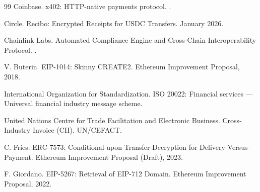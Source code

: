 \documentclass[11pt,a4paper]{article}
\begin{document}
\begin{thebibliography}{99}
Coinbase.
\newblock x402: HTTP-native payments protocol.
.

Circle.
\newblock Recibo: Encrypted Receipts for USDC Transfers.
\newblock January 2026.

Chainlink Labs.
\newblock Automated Compliance Engine and Cross-Chain Interoperability Protocol.
.

V. Buterin.
\newblock EIP-1014: Skinny CREATE2.
\newblock Ethereum Improvement Proposal, 2018.

International Organization for Standardization.
\newblock ISO 20022: Financial services --- Universal financial industry message scheme.

United Nations Centre for Trade Facilitation and Electronic Business.
\newblock Cross-Industry Invoice (CII).
\newblock UN/CEFACT.

C. Fries.
\newblock ERC-7573: Conditional-upon-Transfer-Decryption for Delivery-Versus-Payment.
\newblock Ethereum Improvement Proposal (Draft), 2023.

F. Giordano.
\newblock EIP-5267: Retrieval of EIP-712 Domain.
\newblock Ethereum Improvement Proposal, 2022.

\end{thebibliography}
\end{document}
